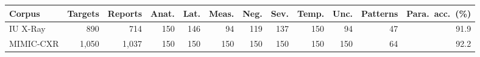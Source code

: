 \begin{tabular}{lrrrrrrrrrrr}
\toprule
\textbf{Corpus} & \textbf{Targets} & \textbf{Reports} & Anat. & Lat. & Meas. & Neg. & Sev. & Temp. & Unc. & \textbf{Patterns} & \textbf{Para.\ acc.\ (\%)} \\
\midrule
IU X-Ray & 890 & 714 & 150 & 146 & 94 & 119 & 137 & 150 & 94 & 47 & 91.9 \\
MIMIC-CXR & 1,050 & 1,037 & 150 & 150 & 150 & 150 & 150 & 150 & 150 & 64 & 92.2 \\
\bottomrule
\end{tabular}
